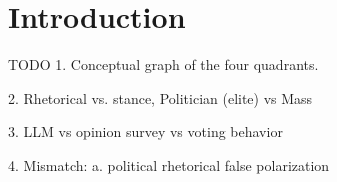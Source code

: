 \section{Introduction}
\label{sec:intro}

TODO
1. Conceptual graph of the four quadrants.


2. Rhetorical vs. stance, Politician (elite) vs Mass


3. LLM vs  opinion survey vs voting behavior


4. Mismatch: a. political rhetorical false polarization
